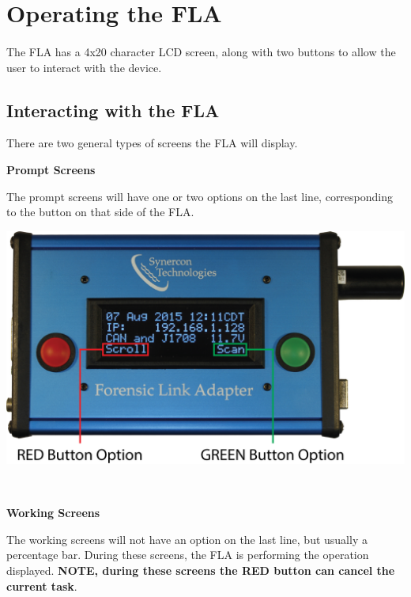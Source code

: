 \documentclass[11pt, oneside]{book}
\begin{document}
\section{Operating the FLA}
\paragraph{  }
The FLA has a 4x20 character LCD screen, along with two buttons to
allow the user to interact with the device.


\subsection{Interacting with the FLA}

There are two general types of screens the FLA will display.
\\[\baselineskip]
\noindent\begin{minipage}{0.45\textwidth}%
\begin{center}
\textbf{Prompt Screens}
\end{center}
	The prompt screens will have one or two options on the last line, corresponding to the button on that side of the FLA.
\end{minipage}%
\hfill%
\begin{minipage}{0.45\textwidth} 
	\includegraphics[width=\linewidth]{../media/graphics/fla_option_screen} 
\end{minipage}\\[\baselineskip]
\noindent\begin{minipage}{0.45\textwidth}%
\begin{center}
\textbf{Working Screens}
\end{center}
The working screens will not have an option on the last line, but usually a percentage bar. During these screens, the FLA is performing the operation displayed. \textbf{NOTE, during these screens the RED button can cancel the current task}.
\end{minipage}%
\end{document}
